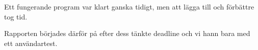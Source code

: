 Ett fungerande program var klart ganska tidigt,
men att lägga till och förbättre tog tid.

Rapporten börjades därför på efter dess tänkte deadline
och vi hann bara med ett användartest.

